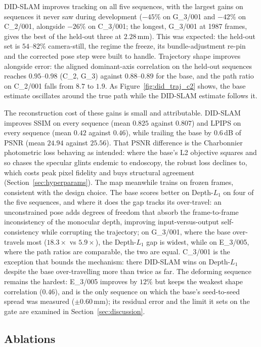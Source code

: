 \documentclass{article}
\begin{document}
\FloatBarrier
DID-SLAM improves tracking on all five sequences, with the largest gains on sequences it never saw during development ($-45\%$ on G\_3/001 and $-42\%$ on C\_2/001, alongside $-26\%$ on C\_3/001; the longest, G\_3/001 at 1987 frames, gives the best of the held-out three at $2.28$\,mm). This was expected: the held-out set is $54$--$82\%$ camera-still, the regime the freeze, its bundle-adjustment re-pin and the corrected pose step were built to handle. Trajectory shape improves alongside error: the aligned dominant-axis correlation on the held-out sequences reaches $0.95$--$0.98$ (C\_2, G\_3) against $0.88$--$0.89$ for the base, and the path ratio on C\_2/001 falls from $8.7$ to $1.9$. As Figure~\ref{fig:did_traj_c2} shows, the base estimate oscillates around the true path while the DID-SLAM estimate follows it.

The reconstruction cost of these gains is small and attributable. DID-SLAM improves SSIM on every sequence (mean $0.825$ against $0.807$) and LPIPS on every sequence (mean $0.42$ against $0.46$), while trailing the base by $0.6$\,dB of PSNR (mean $24.94$ against $25.56$). That PSNR difference is the Charbonnier photometric loss behaving as intended: where the base's L2 objective squares and so chases the specular glints endemic to endoscopy, the robust loss declines to, which costs peak pixel fidelity and buys structural agreement (Section~\ref{sec:hyperparams}). The map meanwhile trains on frozen frames, consistent with the design choice. The base scores better on Depth-$L_1$ on four of the five sequences, and where it does the gap tracks its over-travel: an unconstrained pose adds degrees of freedom that absorb the frame-to-frame inconsistency of the monocular depth, improving input-versus-output self-consistency while corrupting the trajectory; on G\_3/001, where the base over-travels most ($18.3\times$ vs $5.9\times$), the Depth-$L_1$ gap is widest, while on E\_3/005, where the path ratios are comparable, the two are equal. C\_3/001 is the exception that bounds the mechanism: there DID-SLAM wins on Depth-$L_1$ despite the base over-travelling more than twice as far. The deforming sequence remains the hardest: E\_3/005 improves by $12\%$ but keeps the weakest shape correlation ($0.46$), and is the only sequence on which the base's seed-to-seed spread was measured ($\pm 0.60$\,mm); its residual error and the limit it sets on the gate are examined in Section~\ref{sec:discussion}.


\subsection{Ablations}
\label{sec:results_ablations}
\end{document}
